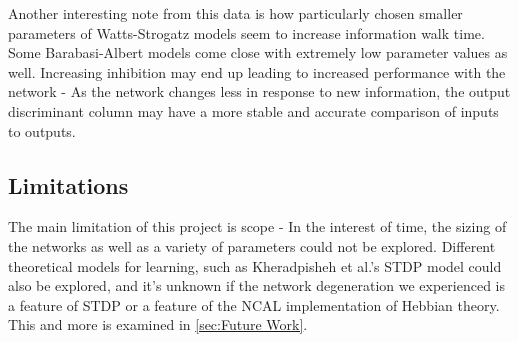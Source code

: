 Another interesting note from this data is how particularly chosen smaller
parameters of Watts-Strogatz models seem to increase information walk time. Some
Barabasi-Albert models come close with extremely low parameter values as well.
Increasing inhibition may end up leading to increased performance with the
network - As the network changes less in response to new information, the output
discriminant column may have a more stable and accurate comparison of inputs to
outputs.

\subsection{Limitations}

The main limitation of this project is scope - In the interest of time, the
sizing of the networks as well as a variety of parameters could not be explored.
Different theoretical models for learning, such as Kheradpisheh et al.'s STDP
model \cite{Kheradpisheh} could also be explored, and it's unknown if the
network degeneration we experienced is a feature of STDP or a feature of the
NCAL implementation of Hebbian theory. This and more is examined in
\ref{sec:Future Work}.